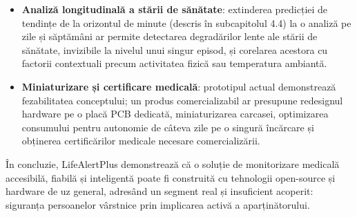 \documentclass[12pt,a4paper,twoside]{article}
\begin{document}
\begin{itemize}[leftmargin=1.5em]
\item \textbf{Analiză longitudinală a stării de sănătate}: extinderea predicției de tendințe de la orizontul de minute (descris în subcapitolul 4.4) la o analiză pe zile și săptămâni ar permite detectarea degradărilor lente ale stării de sănătate, invizibile la nivelul unui singur episod, și corelarea acestora cu factorii contextuali precum activitatea fizică sau temperatura ambiantă.

\item \textbf{Miniaturizare și certificare medicală}: prototipul actual demonstrează fezabilitatea conceptului; un produs comercializabil ar presupune redesignul hardware pe o placă PCB dedicată, miniaturizarea carcasei, optimizarea consumului pentru autonomie de câteva zile pe o singură încărcare și obținerea certificărilor medicale necesare comercializării.
\end{itemize}

În concluzie, LifeAlertPlus demonstrează că o soluție de monitorizare medicală accesibilă, fiabilă și inteligentă poate fi construită cu tehnologii open-source și hardware de uz general, adresând un segment real și insuficient acoperit: siguranța persoanelor vârstnice prin implicarea activă a aparținătorului.
\end{document}
